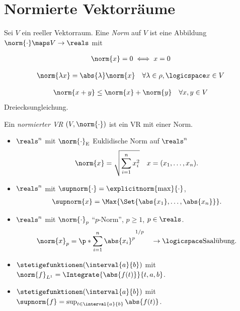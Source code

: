 \chapter{Normierte Vektorräume}
\begin{definition}\label{norm}
    Sei \( V \) ein reeller Vektorraum. Eine \emph{Norm} auf \( V \) ist eine Abbildung \( \norm{\cdot}\maps V\to \reals \) mit
    \begin{eigenschaftenenumerate}
        \item\label{norm:positiv_definit}
        \begin{align*}
            \norm{x}=0\iff x=0
        \end{align*}
        \item \label{norm:betrags_homogen}
        \begin{align*}
            \norm{\lambda x}=\abs{\lambda}\norm{x}\quad \forall \lambda\in \rho,\logicspace x\in V
        \end{align*}
        
        \item \label{norm:dreiecksungleichung}\begin{align*}
            \norm{x+y}\leq \norm{x}+\norm{y}\quad \forall x,y\in V
        \end{align*}
        Dreiecksungleichung.
    \end{eigenschaftenenumerate}
    Ein \emph{normierter VR} \( (V,\norm{\cdot}) \) ist ein VR mit einer Norm.
\end{definition}
\begin{beispiele*}
    \begin{itemize}
        \item \( \reals^n \) mit \( \norm{\cdot}_{\text{E}} \) Euklidische Norm auf \( \reals^n \)
        \begin{align*}
            \norm{x}=\sqrt{\sum_{i=1}^{n}x_i^2}\quad x=(x_{1},\dotsc,x_n).
        \end{align*}
        \item \( \reals^n \) mit \( \supnorm{\cdot}=\explicitnorm{\max}{\cdot} \),
        \begin{align*}
            \supnorm{x}=\Max{\Set{\abs{x_1},\dotsc,\abs{x_n}}}.
        \end{align*}
        \item \( \reals^n \) mit \( \norm{\cdot}_p \) \enquote{\( p \)-Norm}, \( p\geq 1 \), \( p\in \reals \).
        \begin{align*}
            \norm{x}_{p}=\p*{ \sum_{i=1}^{n}\abs{x_i}^p }^{1/p}\quad \to\logicspace  \text{Saalübung}.
        \end{align*}
        \item \( \stetigefunktionen(\interval{a}{b}) \) mit \( \norm{f}_{L^1}=\Integrate{\abs{f(t)}}{t,a,b} \). 
        \item \( \stetigefunktionen(\interval{a}{b}) \) mit \( \supnorm{f}=\sup_{t\in \interval{a}{b}}\abs{f(t)} \). 
    \end{itemize}
\end{beispiele*}

